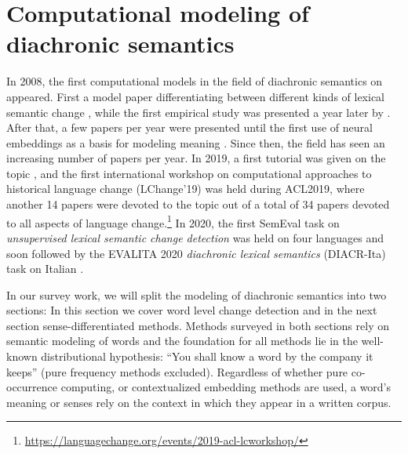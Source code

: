 \documentclass[output=paper]{langsci/langscibook}
\begin{document}
\section{Computational modeling of diachronic semantics}\label{sec:wsch}
In 2008, the first computational models in the field of diachronic semantics on appeared. First a model paper differentiating between different kinds of lexical semantic change \citep{tahmasebi2008}, while the first empirical study was presented a year later by \citet{sagi-etal-2009-semantic}. After that, a few papers per year were presented until the first use of neural embeddings as a basis for modeling meaning \citep{kim-etal-2014-temporal}. Since then, the field has seen an increasing number of papers per year. In 2019, a first tutorial was given on the topic \citep{eisenstein2019measuring}, and  the first international workshop on computational approaches to historical language change (LChange'19) was held during ACL2019, \citep{ws-2019-international-approaches} where another 14 papers were devoted to the topic out of a total of 34 papers devoted to all aspects of language change.\footnote{\url{https://languagechange.org/events/2019-acl-lcworkshop/}}  In 2020, the first SemEval task on \emph{unsupervised lexical semantic change detection}  was held on four languages \citep{schlechtweg-etal-2020-semeval} and soon followed by the EVALITA 2020 \emph{diachronic lexical semantics} (DIACR-Ita) task on Italian \citep{diacrita_evalita2020}.


In our survey work, we will split the modeling of diachronic semantics into two sections: In this section we cover word level change detection and in the next section sense-differentiated methods. Methods surveyed in both sections rely on semantic modeling of words and the foundation for all methods lie in the well-known distributional hypothesis: ``You shall know a word by the company it keeps'' \citep[11]{firth1957} (pure frequency methods excluded). Regardless of whether pure co-occurrence computing, or contextualized embedding methods are used, a word's meaning or senses rely on the context in which they appear in a written corpus.
\end{document}
